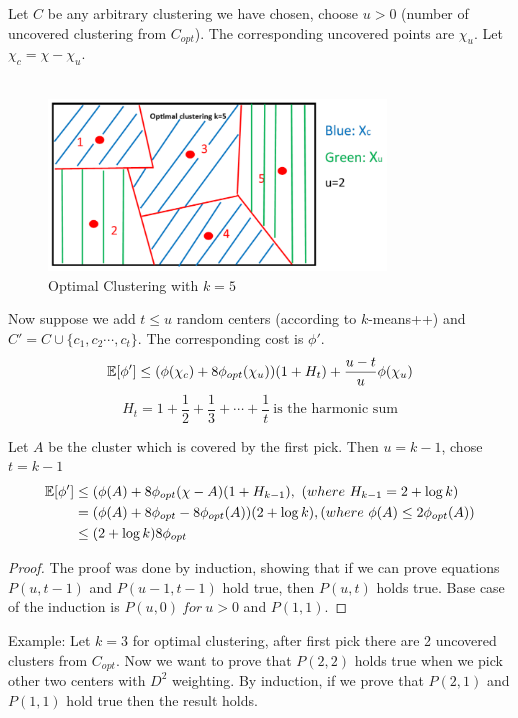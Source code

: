 \begin{lemma}
  Let $C$ be any arbitrary clustering we have chosen, choose $u>0$
  (number of uncovered clustering from $C_{opt}$). The corresponding
  uncovered points are $\chi_u$. Let $\chi_c=\chi-\chi_u$.\\\\ 
  \begin{figure}[H]
    \centering
    \includegraphics[width=0.8\textwidth]{chapter_1/files/pick_from_uncovered_points.png}
    \caption{\small Optimal Clustering with $k=5$}
  \end{figure}
  Now suppose we add $t\leq u$ random centers (according to
  $k$-means++) and $C'=C\cup\{c_1,c_2\cdots, c_t\}$. The corresponding
  cost is $\phi'$.\\ 
  $$\mathbb{E}[\phi']\leq(\phi(\chi_c)+8\phi_{opt}(\chi_u))(1+H_t)+\frac{u-t}{u}\phi(\chi_u)$$ 
  $$H_t=1+\frac{1}{2}+\frac{1}{3}+\cdots+\frac{1}{t}\ \text{is the harmonic sum}$$
\end{lemma} 
Let $A$ be the cluster which is covered by the first pick. Then
$u=k-1$, chose $t=k-1$ 
\begin{align*}
  \E[\phi']&\leq(\phi(A)+8\phi_{opt}(\chi-A)(1+H_{k-1}),\ (where\ H_{k-1}=2+\log
  k)\\ 
  &= (\phi(A)+8\phi_{opt}-8\phi_{opt}(A))(2+\log k),
  (where\ \phi(A)\leq2\phi_{opt}(A))\\  
  &\leq(2+\log k)8\phi_{opt}		
\end{align*}
\begin{proof}
  The proof was done by induction, showing that if we can prove
  equations $P(u,t-1)$ and $P(u-1,t-1)$ hold true, then $P(u,t)$ holds
  true. Base case of the induction is $P(u,0)\ for\ u>0$ and
  $P(1,1)$. 
\end{proof}
Example: Let $k=3$ for optimal clustering, after first pick there are
2 uncovered clusters from $C_{opt}$. Now we want to prove that
$P(2,2)$ holds true when we pick other two centers with $D^2$
weighting. By induction, if we prove that $P(2,1)$ and $P(1,1)$ hold
true then the result holds.  
	
